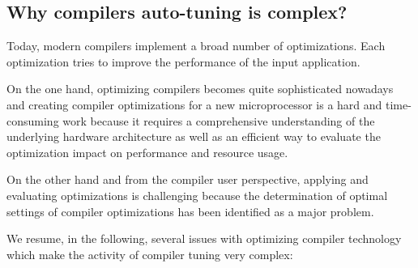  
 
 

\subsection{Why compilers auto-tuning is complex?}
\label{sec:Why compilers auto-tuning is complex?}
Today, modern compilers implement a broad number of optimizations. Each optimization tries to improve the performance of the input application.

On the one hand, optimizing compilers becomes quite sophisticated nowadays and creating compiler optimizations for a new microprocessor is a hard and time-consuming work because it requires a comprehensive understanding of the underlying hardware architecture as well as an efficient way to evaluate the optimization impact on performance and resource usage. 

On the other hand and from the compiler user perspective, applying and evaluating optimizations is challenging because the determination of optimal settings of compiler optimizations has been identified as a major problem\cite{knijnenburg2002iterative}.

We resume, in the following, several issues with optimizing compiler technology which make the activity of compiler tuning very complex:

